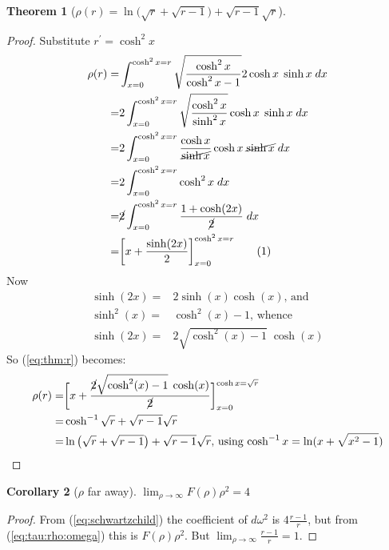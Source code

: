 \documentclass[]{article}
\newcommand\numberthis{\addtocounter{equation}{1}\tag{\theequation}}
\newtheorem{thm}{Theorem}
\newtheorem{cor}[thm]{Corollary}
\begin{document}
{\begin{thm}[$\rho(r) = \ln \big( \sqrt{r}+ \sqrt{r-1}\big) + \sqrt{r-1} \sqrt{r}$]
\end{thm}

\begin{proof}
	Substitute $r^\prime = \cosh^2 x$
	\begin{align*}
		\rho(r) =& \int_{x=0}^{\cosh^2 x=r}\sqrt{\frac{\cosh^2 x}{\cosh^2 x-1}} 2 \cosh {x}\; \sinh {x} \; dx\\
		=& 2 \int_{x=0}^{\cosh^2 x=r}\sqrt{\frac{\cosh^2 x}{\sinh^2 x}}  \cosh {x}\; \sinh {x} \; dx\\
		=& 2 \int_{x=0}^{\cosh^2 x=r}\frac{\cosh x}{\cancel{\sinh x}} \cosh {x}\; \cancel{\sinh {x}} \; dx\\
		=& 2 \int_{x=0}^{\cosh^2 x=r} \cosh^2 {x} \; dx\\
		=& \cancel{2} \int_{x=0}^{\cosh^2 x=r} \frac{1 + \cosh(2x)}{\cancel{2}} \; dx\\
		=& \bigg[x + \frac{\sinh (2x)}{2}\bigg]_{x=0}^{\cosh^2 x=r} \numberthis \label{eq:thm:r}
	\end{align*}
	Now
	\begin{align*}
		\sinh (2x) =& 2 \sinh (x) \cosh(x) \text{, and}\\
		\sinh^2(x) =& \cosh^2(x) - 1 \text{, whence }\\
		\sinh (2x) =& 2 \sqrt{\cosh^2(x) - 1} \; \cosh(x)
	\end{align*}
	So (\ref{eq:thm:r}) becomes:
	\begin{align*}
		\rho(r) =&\bigg[x + \frac{\cancel{2} \sqrt{\cosh^2(x) - 1} \; \cosh(x)}{\cancel{2}}\bigg]_{x=0}^{\cosh x=\sqrt{r}} \\
		=& \cosh^{-1} \sqrt{r} + \sqrt{r-1} \sqrt{r}\\
		=& \ln \big( \sqrt{r}+ \sqrt{r-1}\big) + \sqrt{r-1} \sqrt{r} \text{, using $\cosh^{-1} x= \ln(x + \sqrt{x^2-1})$}
	\end{align*}
\end{proof}

\begin{cor}[$\rho$ far away]\label{cor:far:away}
	$\lim_{\rho \rightarrow \infty}F(\rho) \rho^2=4$
\end{cor}

\begin{proof}
	From (\ref{eq:schwartzchild}) the coefficient of $d\omega^2$ is $4 \frac{r-1}{r}$, but from (\ref{eq:tau:rho:omega}) this is $F(\rho) \rho^2$. But $\lim_{\rho \rightarrow \infty} \frac{r-1}{r} = 1$.
\end{proof}


}
\end{document}
